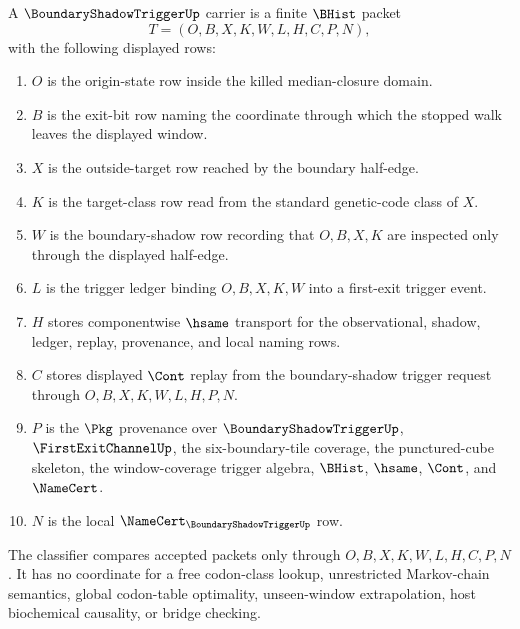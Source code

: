\begin{definition}
\label{def:boundary-shadow-trigger-carrier}
A $\BoundaryShadowTriggerUp$ carrier is a finite $\BHist$ packet
$$
T=(O,B,X,K,W,L,H,C,P,N),
$$
with the following displayed rows:
\begin{enumerate}
\item $O$ is the origin-state row inside the killed median-closure domain.
\item $B$ is the exit-bit row naming the coordinate through which the stopped walk leaves the displayed window.
\item $X$ is the outside-target row reached by the boundary half-edge.
\item $K$ is the target-class row read from the standard genetic-code class of $X$.
\item $W$ is the boundary-shadow row recording that $O,B,X,K$ are inspected only through the displayed half-edge.
\item $L$ is the trigger ledger binding $O,B,X,K,W$ into a first-exit trigger event.
\item $H$ stores componentwise $\hsame$ transport for the observational, shadow, ledger, replay, provenance, and local naming rows.
\item $C$ stores displayed $\Cont$ replay from the boundary-shadow trigger request through $O,B,X,K,W,L,H,P,N$.
\item $P$ is the $\Pkg$ provenance over $\BoundaryShadowTriggerUp$, $\FirstExitChannelUp$, the six-boundary-tile coverage, the punctured-cube skeleton, the window-coverage trigger algebra, $\BHist$, $\hsame$, $\Cont$, and $\NameCert$.
\item $N$ is the local $\NameCert_{\BoundaryShadowTriggerUp}$ row.
\end{enumerate}
The classifier compares accepted packets only through $O,B,X,K,W,L,H,C,P,N$. It has no coordinate for a free codon-class lookup, unrestricted Markov-chain semantics, global codon-table optimality, unseen-window extrapolation, host biochemical causality, or bridge checking.
\end{definition}

